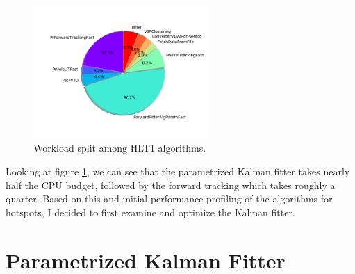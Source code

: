 \documentclass[12pt]{article}
\begin{document}
	\begin{figure}[H]
		\begin{center}
			\includegraphics[width=0.6\textwidth]{algo_usage_original_bestphys}
		\end{center}
		\caption{Workload split among HLT1 algorithms.}
		\label{fig_algo_usage_choice}
	\end{figure}

	Looking at figure \ref{fig_algo_usage_choice}, we can see that the parametrized Kalman fitter takes nearly half the CPU budget, followed by the forward tracking which takes roughly a quarter. Based on this and initial performance profiling of the algorithms for hotspots, I decided to first examine and optimize the Kalman fitter. 
	
	\section{Parametrized Kalman Fitter}
	
\end{document}
